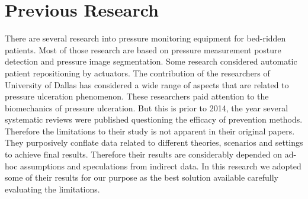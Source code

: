 \section{Previous Research}
There are several research into pressure monitoring equipment for bed-ridden patients. Most of those research are based on pressure measurement posture detection and pressure image segmentation. Some research considered automatic patient repositioning by actuators. \cite{smartmat,smartmat2}  The contribution of the researchers of University of Dallas has considered a wide range of aspects that are related to pressure ulceration phenomenon. \cite{schedule}  These researchers paid attention to the biomechanics of pressure ulceration. But this is prior to 2014, the year several systematic reviews were published questioning the efficacy of prevention methods. Therefore the limitations to their study is not apparent in their original papers. They purposively conflate data related to different theories, scenarios and settings to achieve final results. Therefore their results are considerably depended on ad-hoc assumptions and speculations from indirect data. In this research we adopted some of their results for our purpose as the best solution available carefully evaluating the limitations.


